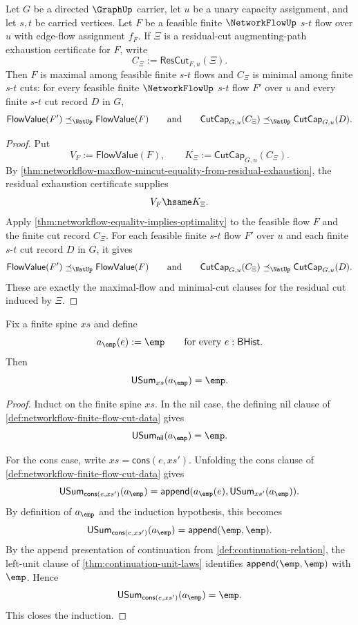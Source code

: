 \begin{corollary}
\label{cor:networkflow-residual-exhaustion-optimality}
Let $G$ be a directed $\GraphUp$ carrier, let $u$ be a unary capacity assignment, and let $s,t$ be carried vertices. Let $F$ be a feasible finite $\NetworkFlowUp$ $s$-$t$ flow over $u$ with edge-flow assignment $f_F$. If $\Xi$ is a residual-cut augmenting-path exhaustion certificate for $F$, write
$$
C_\Xi:=\mathsf{ResCut}_{F,u}(\Xi).
$$
Then $F$ is maximal among feasible finite $s$-$t$ flows and $C_\Xi$ is minimal among finite $s$-$t$ cuts: for every feasible finite $\NetworkFlowUp$ $s$-$t$ flow $F'$ over $u$ and every finite $s$-$t$ cut record $D$ in $G$,
$$
\mathsf{FlowValue}(F')
\preceq_{\NatUp}
\mathsf{FlowValue}(F)
\qquad\text{and}\qquad
\mathsf{CutCap}_{G,u}(C_\Xi)
\preceq_{\NatUp}
\mathsf{CutCap}_{G,u}(D).
$$
\end{corollary}
\begin{proof}
Put
$$
V_F:=\mathsf{FlowValue}(F),
\qquad
K_\Xi:=\mathsf{CutCap}_{G,u}(C_\Xi).
$$
By \autoref{thm:networkflow-maxflow-mincut-equality-from-residual-exhaustion}, the residual exhaustion certificate supplies
$$
V_F\hsame K_\Xi.
$$
Apply \autoref{thm:networkflow-equality-implies-optimality} to the feasible flow $F$ and the finite cut record $C_\Xi$. For each feasible finite $s$-$t$ flow $F'$ over $u$ and each finite $s$-$t$ cut record $D$ in $G$, it gives
$$
\mathsf{FlowValue}(F')
\preceq_{\NatUp}
\mathsf{FlowValue}(F)
\qquad\text{and}\qquad
\mathsf{CutCap}_{G,u}(C_\Xi)
\preceq_{\NatUp}
\mathsf{CutCap}_{G,u}(D).
$$
These are exactly the maximal-flow and minimal-cut clauses for the residual cut induced by $\Xi$.
\end{proof}

\begin{lemma}
\label{lem:networkflow-unary-fold-constant-empty}
Fix a finite spine $xs$ and define
$$
a_{\emp}(e):=\emp
\qquad\text{for every }e:\mathsf{BHist}.
$$
Then
$$
\mathsf{USum}_{xs}(a_{\emp})=\emp.
$$
\end{lemma}
\begin{proof}
Induct on the finite spine $xs$. In the nil case, the defining nil clause of \autoref{def:networkflow-finite-flow-cut-data} gives
$$
\mathsf{USum}_{\mathsf{nil}}(a_{\emp})=\emp.
$$

For the cons case, write $xs=\mathsf{cons}(e,xs')$. Unfolding the cons clause of \autoref{def:networkflow-finite-flow-cut-data} gives
$$
\mathsf{USum}_{\mathsf{cons}(e,xs')}(a_{\emp})
=
\mathsf{append}(a_{\emp}(e),\mathsf{USum}_{xs'}(a_{\emp})).
$$
By definition of $a_{\emp}$ and the induction hypothesis, this becomes
$$
\mathsf{USum}_{\mathsf{cons}(e,xs')}(a_{\emp})
=
\mathsf{append}(\emp,\emp).
$$
By the append presentation of continuation from \autoref{def:continuation-relation}, the left-unit clause of \autoref{thm:continuation-unit-laws} identifies $\mathsf{append}(\emp,\emp)$ with $\emp$. Hence
$$
\mathsf{USum}_{\mathsf{cons}(e,xs')}(a_{\emp})=\emp.
$$
This closes the induction.
\end{proof}


